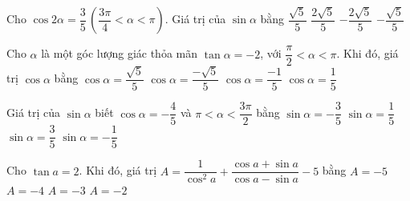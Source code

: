 \begin{ex}%
	Cho $ \cos 2\alpha=\dfrac{3}{5}\,\left(\dfrac{3\pi}{4}<\alpha<\pi\right) $.  Giá trị của $ \sin \alpha $ bằng
	\choice
	{\True $ \dfrac{\sqrt{5}}{5} $}
	{$ \dfrac{2\sqrt{5}}{5} $}
	{$ -\dfrac{2\sqrt{5}}{5} $}
	{$ -\dfrac{\sqrt{5}}{5} $}
\end{ex}

\begin{ex}%
	Cho $\alpha$ là một góc lượng giác thỏa mãn $\tan \alpha=-2$, với $\dfrac{\pi}{2}<\alpha<\pi$. Khi đó, giá trị $\cos \alpha$ bằng
	\choice
	{$\cos \alpha=\dfrac{\sqrt{5}}{5}$}
	{\True $\cos \alpha=\dfrac{-\sqrt{5}}{5}$}
	{$\cos \alpha=\dfrac{-1}{5}$}
	{$\cos \alpha=\dfrac{1}{5}$}
\end{ex}

\begin{ex}%
	Giá trị của $\sin \alpha$ biết $\cos \alpha=-\dfrac{4}{5}$ và $\pi<\alpha<\dfrac{3 \pi}{2}$ bằng
	\choice
	{\True $\sin \alpha=-\dfrac{3}{5}$}
	{$\sin \alpha=\dfrac{1}{5}$}
	{$\sin \alpha=\dfrac{3}{5}$}
	{$\sin \alpha=-\dfrac{1}{5}$}
\end{ex}

\begin{ex}%
	Cho $\tan a=2$. Khi đó, giá trị $A=\dfrac{1}{\cos^2a}+\dfrac{\cos a+\sin a}{\cos a-\sin a}-5$ bằng
	\choice
	{$A=-5$}
	{$A=-4$}
	{\True $A=-3$}
	{$A=-2$}
\end{ex}


